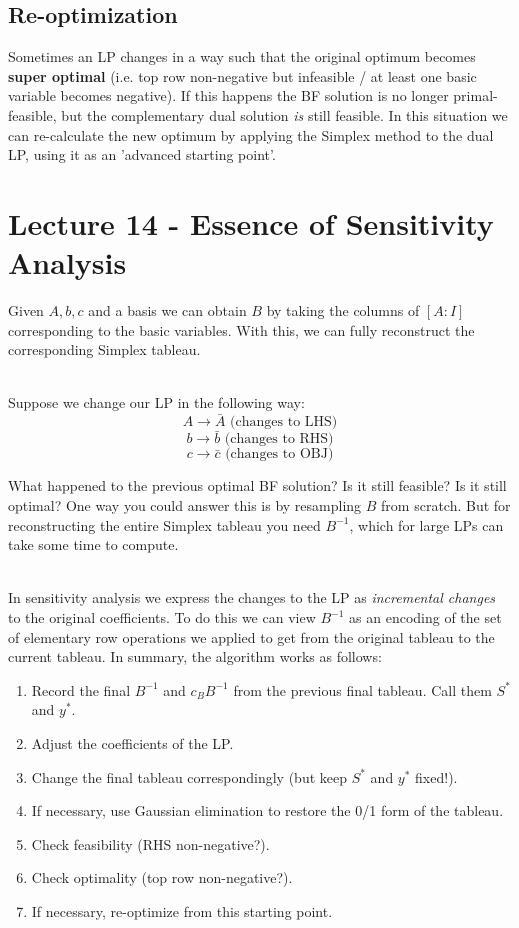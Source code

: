 \documentclass[12pt]{article}
\begin{document}
\subsection*{Re-optimization}
Sometimes an LP changes in a way such that the original optimum becomes \textbf{super optimal} (i.e. top row non-negative but infeasible / at least one basic variable becomes negative).
If this happens the BF solution is no longer primal-feasible, but the complementary dual solution \textit{is} still feasible.
In this situation we can re-calculate the new optimum by applying the Simplex method to the dual LP, using it as an 'advanced starting point'.

%
%
\newpage
\section*{Lecture 14 - Essence of Sensitivity Analysis}
Given $A, b, c$ and a basis we can obtain $B$ by taking the columns of $[A:I]$ corresponding to the basic variables.
With this, we can fully reconstruct the corresponding Simplex tableau.

\noindent
\\
Suppose we change our LP in the following way:
\[ A \rightarrow \bar{A} \text{ (changes to LHS)} \]
\[ b \rightarrow \bar{b} \text{ (changes to RHS)} \]
\[ c \rightarrow \bar{c} \text{ (changes to OBJ)} \]

\noindent
What happened to the previous optimal BF solution?
Is it still feasible?
Is it still optimal?
One way you could answer this is by resampling $B$ from scratch.
But for reconstructing the entire Simplex tableau you need $B^{-1}$, which for large LPs can take some time to compute.

\noindent
\\
In sensitivity analysis we express the changes to the LP as \textit{incremental changes} to the original coefficients.
To do this we can view $B^{-1}$ as an encoding of the set of elementary row operations we applied to get from the original tableau to the current tableau.
In summary, the algorithm works as follows:

\begin{enumerate}
    \item Record the final $B^{-1}$ and $c_B B^{-1}$ from the previous final tableau. Call them $S^*$ and $y^*$.
    \item Adjust the coefficients of the LP.
    \item Change the final tableau correspondingly (but keep $S^*$ and $y^*$ fixed!).
    \item If necessary, use Gaussian elimination to restore the 0/1 form of the tableau.
    \item Check feasibility (RHS non-negative?).
    \item Check optimality (top row non-negative?).
    \item If necessary, re-optimize from this starting point.
\end{enumerate}
\end{document}
